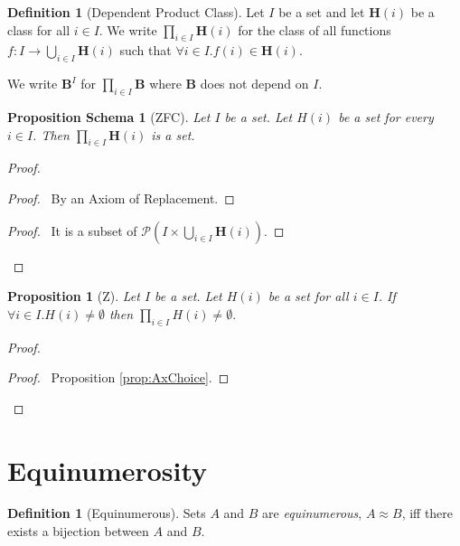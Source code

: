 \documentclass{book}
\let\qed\relax
\newtheorem{prop}[ax]{Proposition}
\newtheorem{props}[ax]{Proposition Schema}
\theoremstyle{definition}
\newtheorem{df}[ax]{Definition}
\begin{document}
\begin{df}[Dependent Product Class]
Let $I$ be a set and let $\mathbf{H}(i)$ be a class for all $i \in I$. We write $\prod_{i \in I} \mathbf{H}(i)$ for the class of all functions $f : I \rightarrow \bigcup_{i \in I} \mathbf{H}(i)$ such that $\forall i \in I. f(i) \in \mathbf{H}(i)$.

We write $\mathbf{B}^I$ for $\prod_{i \in I} \mathbf{B}$ where $\mathbf{B}$ does not depend on $I$.
\end{df}

\begin{props}[ZFC]
Let $I$ be a set. Let $H(i)$ be a set for every $i \in I$. Then $\prod_{i \in I} \mathbf{H}(i)$ is a set.
\end{props}

\begin{proof}
\pf
{}
\begin{proof}
	\pf\ By an Axiom of Replacement.
\end{proof}
\begin{proof}
	\pf\ It is a subset of $\mathcal{P}\left( I \times \bigcup_{i \in I} \mathbf{H}(i) \right)$.
\end{proof}
\qed
\end{proof}

\begin{prop}[Z]
Let $I$ be a set. Let $H(i)$ be a set for all $i \in I$. If $\forall i \in I. H(i) \neq \emptyset$ then $\prod_{i \in I} H(i) \neq \emptyset.$
\end{prop}

\begin{proof}
\pf
{}
\begin{proof}
	\pf\ Proposition \ref{prop:AxChoice}.
\end{proof}
\qed
\end{proof}

\section{Equinumerosity}

\begin{df}[Equinumerous]
Sets $A$ and $B$ are \emph{equinumerous}, $A \approx B$, iff there exists a bijection between $A$ and $B$.
\end{df}
\end{document}
